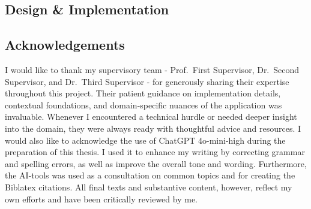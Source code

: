 \documentclass[11pt]{report}
\begin{document}
\begin{refsection}
  \part{Design \& Implementation}
  
\end{refsection}

\cleardoublepage
\printbibliography[heading=subbibliography,title={Foundations},section=1]
\printbibliography[heading=subbibliography,title={Technological Implementation},section=2]


\appendix

\clearpage
\chapter{Acknowledgements}

\noindent I would like to thank my supervisory team - Prof.\ First Supervisor, Dr.\ Second Supervisor, and Dr.\ Third Supervisor - for generously sharing their expertise throughout this project.
Their patient guidance on implementation details, contextual foundations, and domain-specific nuances of the application was invaluable. Whenever I encountered a technical
hurdle or needed deeper insight into the domain, they were always ready with thoughtful advice and resources.
\vspace{1ex}
\noindent I would also like to acknowledge the use of ChatGPT 4o-mini-high during the preparation of this thesis. I used it to enhance my writing by correcting grammar
and spelling errors, as well as improve the overall tone and wording.
Furthermore, the AI-tools was used as a consultation on common topics and for creating the Biblatex citations.
All final texts and substantive content, however, reflect my own efforts and have been critically reviewed by me.
\clearpage
\end{document}
